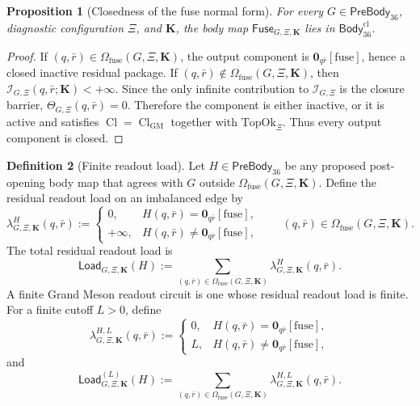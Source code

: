\documentclass[11pt]{article}
\theoremstyle{definition}
\newtheorem{definition}{Definition}
\theoremstyle{plain}
\newtheorem{proposition}[definition]{Proposition}
\DeclareMathOperator{\Cl}{Cl}
\begin{document}
\begin{proposition}[Closedness of the fuse normal form]
For every \(G\in\mathsf{PreBody}_{36}\), diagnostic configuration \(\Xi\),
and \(\mathbf K\), the body map
\(\mathsf{Fuse}_{G,\Xi,\mathbf K}\) lies in
\(\mathsf{Body}_{36}^{\mathrm{cl}}\).
\end{proposition}

\begin{proof}
If \((q,\bar r)\in\Omega_{\mathrm{fuse}}(G,\Xi,\mathbf K)\), the output
component is \(\mathbf 0_{q\bar r}[\mathrm{fuse}]\), hence a closed
inactive residual package.  If
\((q,\bar r)\notin\Omega_{\mathrm{fuse}}(G,\Xi,\mathbf K)\), then
\(\mathcal I_{G,\Xi}(q,\bar r;\mathbf K)<+\infty\).  Since the only
infinite contribution to \(\mathcal I_{G,\Xi}\) is the closure barrier,
\(\Theta_{G,\Xi}(q,\bar r)=0\).  Therefore the component is either inactive,
or it is active and satisfies \(\Cl=\Cl_{\mathrm{GM}}\) together with
\(\mathrm{TopOk}_{\Xi}\).  Thus every output component is closed.
\end{proof}

\begin{definition}[Finite readout load]
Let \(H\in\mathsf{PreBody}_{36}\) be any proposed post-opening body map
that agrees with \(G\) outside
\(\Omega_{\mathrm{fuse}}(G,\Xi,\mathbf K)\).  Define the residual
readout load on an imbalanced edge by
\[
  \lambda_{G,\Xi,\mathbf K}^{H}(q,\bar r)
  :=
  \begin{cases}
    0,
      & H(q,\bar r)=\mathbf 0_{q\bar r}[\mathrm{fuse}],\\
    +\infty,
      & H(q,\bar r)\ne\mathbf 0_{q\bar r}[\mathrm{fuse}],
  \end{cases}
  \qquad
  (q,\bar r)\in\Omega_{\mathrm{fuse}}(G,\Xi,\mathbf K).
\]
The total residual readout load is
\[
  \mathsf{Load}_{G,\Xi,\mathbf K}(H)
  :=
  \sum_{(q,\bar r)\in\Omega_{\mathrm{fuse}}(G,\Xi,\mathbf K)}
  \lambda_{G,\Xi,\mathbf K}^{H}(q,\bar r).
\]
A finite Grand Meson readout circuit is one whose residual readout load is
finite.
For a finite cutoff \(L>0\), define
\[
  \lambda_{G,\Xi,\mathbf K}^{H,L}(q,\bar r)
  :=
  \begin{cases}
    0,
      & H(q,\bar r)=\mathbf 0_{q\bar r}[\mathrm{fuse}],\\
    L,
      & H(q,\bar r)\ne\mathbf 0_{q\bar r}[\mathrm{fuse}],
  \end{cases}
\]
and
\[
  \mathsf{Load}^{(L)}_{G,\Xi,\mathbf K}(H)
  :=
  \sum_{(q,\bar r)\in\Omega_{\mathrm{fuse}}(G,\Xi,\mathbf K)}
  \lambda_{G,\Xi,\mathbf K}^{H,L}(q,\bar r).
\]
\end{definition}
\end{document}
